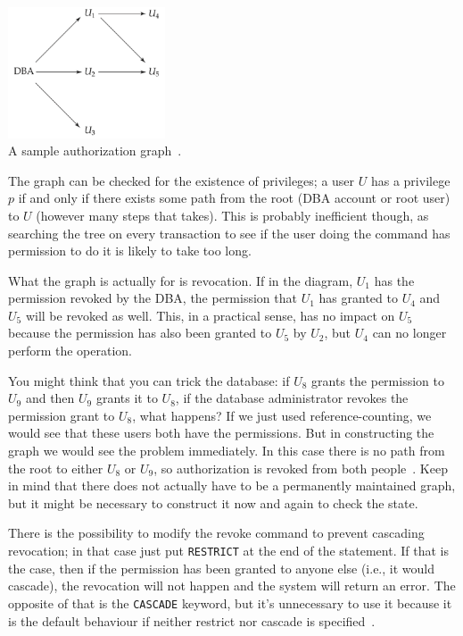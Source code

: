 \begin{center}
\includegraphics[width=0.35\textwidth]{images/auth-graph}\\
A sample authorization graph~\cite{dsc}.
\end{center}

The graph can be checked for the existence of privileges; a user $U$ has a privilege $p$ if and only if there exists some path from the root (DBA account or root user) to $U$ (however many steps that takes). This is probably inefficient though, as searching the tree on every transaction to see if the user doing the command has permission to do it is likely to take too long. 

What the graph is actually for is revocation. If in the diagram, $U_{1}$ has the permission revoked by the DBA, the permission that $U_{1}$ has granted to $U_{4}$ and $U_{5}$ will be revoked as well. This, in a practical sense, has no impact on $U_{5}$ because the permission has also been granted to $U_{5}$ by $U_{2}$, but $U_{4}$ can no longer perform the operation.

You might think that you can trick the database: if $U_{8}$ grants the permission to $U_{9}$ and then $U_{9}$ grants it to $U_{8}$, if the database administrator revokes the permission grant to $U_{8}$, what happens? If we just used reference-counting, we would see that these users both have the permissions. But in constructing the graph we would see the problem immediately. In this case there is no path from the root to either $U_{8}$ or $U_{9}$, so authorization is revoked from both people~\cite{dsc}. Keep in mind that there does not actually have to be a permanently maintained graph, but it might be necessary to construct it now and again to check the state.

There is the possibility to modify the revoke command to prevent cascading revocation; in that case just put \texttt{RESTRICT} at the end of the statement. If that is the case, then if the permission has been granted to anyone else (i.e., it would cascade), the revocation will not happen and the system will return an error. The opposite of that is the \texttt{CASCADE} keyword, but it's unnecessary to use it because it is the default behaviour if neither restrict nor cascade is specified~\cite{dsc}.

